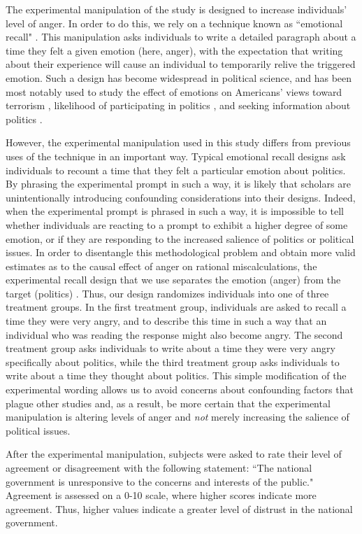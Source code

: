 \documentclass[12pt, letterpaper]{article}
\begin{document}
The experimental manipulation of the study is designed to increase individuals' level of anger. In order to do this, we rely on a technique known as ``emotional recall" \citep{lerneretal2003effects, lerner_kelter2001}. This manipulation asks individuals to write a detailed paragraph about a time they felt a given emotion (here, anger), with the expectation that writing about their experience will cause an individual to temporarily relive the triggered emotion. Such a design has become widespread in political science, and has been most notably used to study the effect of emotions on Americans' views toward terrorism \citep{lerneretal2003effects}, likelihood of participating in politics \citep{vbggh}, and seeking information about politics \citep{valentinoetal2008}.

However, the experimental manipulation used in this study differs from previous uses of the technique in an important way. Typical emotional recall designs ask individuals to recount a time that they felt a particular emotion about politics. By phrasing the experimental prompt in such a way, it is likely that scholars are unintentionally introducing confounding considerations into their designs. Indeed, when the experimental prompt is phrased in such a way, it is impossible to tell whether individuals are reacting to a prompt to exhibit a higher degree of some emotion, or if they are responding to the increased salience of politics or political issues. In order to disentangle this methodological problem and obtain more valid estimates as to the causal effect of anger on rational miscalculations, the experimental recall design that we use separates the emotion (anger) from the target (politics) \citep[see also,][]{webster2017}. Thus, our design randomizes individuals into one of three treatment groups. In the first treatment group, individuals are asked to recall a time they were very angry, and to describe this time in such a way that an individual who was reading the response might also become angry. The second treatment group asks individuals to write about a time they were very angry specifically about politics, while the third treatment group asks individuals to write about a time they thought about politics. This simple modification of the experimental wording allows us to avoid concerns about confounding factors that plague other studies and, as a result, be more certain that the experimental manipulation is altering levels of anger and \emph{not} merely increasing the salience of political issues.

After the experimental manipulation, subjects were asked to rate their level of agreement or disagreement with the following statement: ``The national government is unresponsive to the concerns and interests of the public." Agreement is assessed on a 0-10 scale, where higher scores indicate more agreement. Thus, higher values indicate a greater level of distrust in the national government.
\end{document}
